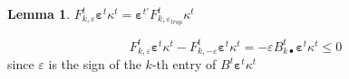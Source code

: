 \documentclass{amsart}
\newtheorem{lemma}[theorem]{Lemma}
\numberwithin{theorem}{section}
\begin{document}
  \begin{lemma}
    $F^t_{k,\varepsilon} \boldsymbol{\varepsilon}^t \kappa^t = \boldsymbol{\varepsilon}^{t'} F^t_{k,\varepsilon_{trop}} \kappa^t$
  \end{lemma}
  \[F^t_{k,\varepsilon} \boldsymbol{\varepsilon}^t \kappa^t - F^t_{k,-\varepsilon} \boldsymbol{\varepsilon}^t \kappa^t=-\varepsilon B^t_{k\bullet} \boldsymbol{\varepsilon}^t \kappa^t \le 0\]
  since $\varepsilon$ is the sign of the $k$-th entry of $B^t \boldsymbol{\varepsilon}^t \kappa^t$



  
\end{document}
